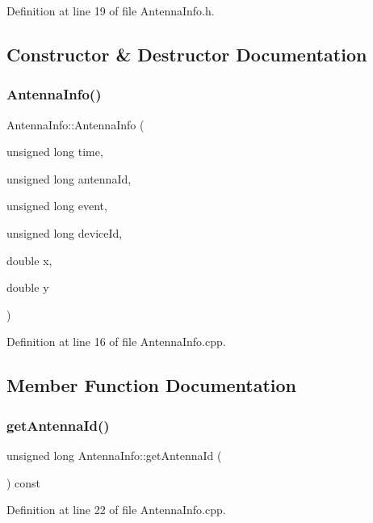 Definition at line 19 of file Antenna\+Info.\+h.



\subsection{Constructor \& Destructor Documentation}
\mbox{\label{class_antenna_info_a3844c960562688818ed9d9cb2bde82d7}} 
\subsubsection{Antenna\+Info()}
{\footnotesize\ttfamily Antenna\+Info\+::\+Antenna\+Info (\begin{DoxyParamCaption}\item[{unsigned long}]{time,  }\item[{unsigned long}]{antenna\+Id,  }\item[{unsigned long}]{event,  }\item[{unsigned long}]{device\+Id,  }\item[{double}]{x,  }\item[{double}]{y }\end{DoxyParamCaption})}



Definition at line 16 of file Antenna\+Info.\+cpp.



\subsection{Member Function Documentation}
\mbox{\label{class_antenna_info_a1aee619b1f3d45e3da945f17d8531bbf}} 
\subsubsection{get\+Antenna\+Id()}
{\footnotesize\ttfamily unsigned long Antenna\+Info\+::get\+Antenna\+Id (\begin{DoxyParamCaption}{ }\end{DoxyParamCaption}) const}



Definition at line 22 of file Antenna\+Info.\+cpp.



